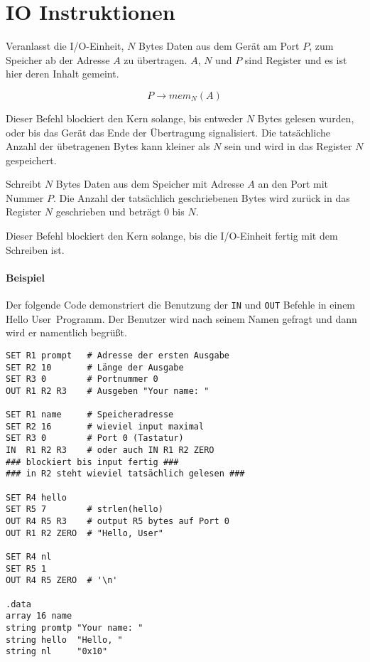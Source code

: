 \section{IO Instruktionen}
\label{sec:IO-Instruktionen}




Veranlasst die I/O-Einheit, $N$ Bytes Daten aus dem Gerät am Port $P$, zum
Speicher ab der Adresse $A$ zu übertragen. $A$, $N$ und $P$ sind Register und es
ist hier deren Inhalt gemeint.

\[
  P \to mem_{N}(A)
\]

Dieser Befehl blockiert den Kern solange, bis entweder $N$ Bytes gelesen wurden,
oder bis das Gerät das Ende der Übertragung signalisiert. Die tatsächliche
Anzahl der übetragenen Bytes kann kleiner als $N$ sein und wird in das Register
$N$ gespeichert.



Schreibt $N$ Bytes Daten aus dem Speicher mit Adresse $A$ an den Port mit
Nummer $P$. Die Anzahl der tatsächlich geschriebenen Bytes wird zurück in das
Register $N$ geschrieben und beträgt $0$ bis $N$.

Dieser Befehl blockiert den Kern solange, bis die I/O-Einheit fertig mit dem
Schreiben ist.


\paragraph{Beispiel}
Der folgende Code demonstriert die Benutzung der \texttt{IN} und \texttt{OUT}
Befehle in einem \glqq Hello User\grqq\ Programm. Der Benutzer wird nach seinem
Namen gefragt und dann wird er namentlich begrüßt.

\begin{lstlisting}
SET R1 prompt   # Adresse der ersten Ausgabe
SET R2 10       # Länge der Ausgabe
SET R3 0        # Portnummer 0
OUT R1 R2 R3    # Ausgeben "Your name: "

SET R1 name     # Speicheradresse
SET R2 16       # wieviel input maximal
SET R3 0        # Port 0 (Tastatur)
IN  R1 R2 R3    # oder auch IN R1 R2 ZERO
### blockiert bis input fertig ###
### in R2 steht wieviel tatsächlich gelesen ###

SET R4 hello
SET R5 7        # strlen(hello)
OUT R4 R5 R3    # output R5 bytes auf Port 0
OUT R1 R2 ZERO  # "Hello, User"

SET R4 nl
SET R5 1
OUT R4 R5 ZERO  # '\n'

.data
array 16 name
string promtp "Your name: "
string hello  "Hello, "
string nl     "0x10"
\end{lstlisting}

